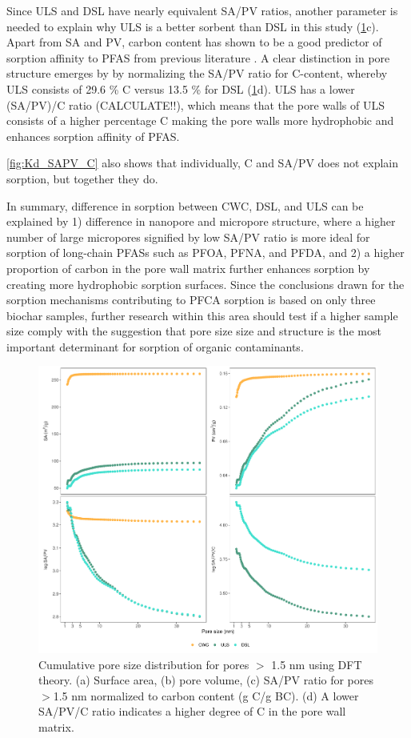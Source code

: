 Since ULS and DSL have nearly equivalent SA/PV ratios, another parameter is needed to explain why ULS is a better sorbent than DSL in this study (\cref{fig:PZD_large}c). Apart from SA and PV, carbon content has shown to be a good predictor of sorption affinity to PFAS from previous literature \citep{Hale2016}. A clear distinction in pore structure emerges by by normalizing the SA/PV ratio for C-content, whereby ULS consists of 29.6 \% C versus 13.5 \% for DSL (\cref{fig:PZD_large}d). ULS has a lower (SA/PV)/C ratio (CALCULATE!!), which means that the pore walls of ULS consists of a higher percentage C making the pore walls more hydrophobic and enhances sorption affinity of PFAS. 

\cref{fig:Kd_SAPV_C} also shows that individually, C and SA/PV does not explain sorption, but together they do.  

In summary, difference in sorption between CWC, DSL, and ULS can be explained by 1) difference in nanopore and micropore structure, where a higher number of large micropores signified by low SA/PV ratio is more ideal for sorption of long-chain PFASs such as PFOA, PFNA, and PFDA, and 2) a higher proportion of carbon in the pore wall matrix further enhances sorption by creating more hydrophobic sorption surfaces. Since the conclusions drawn for the sorption mechanisms contributing to PFCA sorption is based on only three biochar samples, further research within this area should test if a higher sample size comply with the suggestion that pore size size and structure is the most important determinant for sorption of organic contaminants. 

\begin{figure}[htb]
    \centering
    \includegraphics[width=\textwidth]{R/figs/PZD_SAPV_C_large.pdf}
    \caption{Cumulative pore size distribution for pores $>$ 1.5 nm using DFT theory. (a) Surface area, (b) pore volume, (c) SA/PV ratio for pores $>$1.5 nm normalized to carbon content (g C/g BC). (d) A lower SA/PV/C ratio indicates a higher degree of C in the pore wall matrix.}
    \label{fig:PZD_large}
\end{figure}


